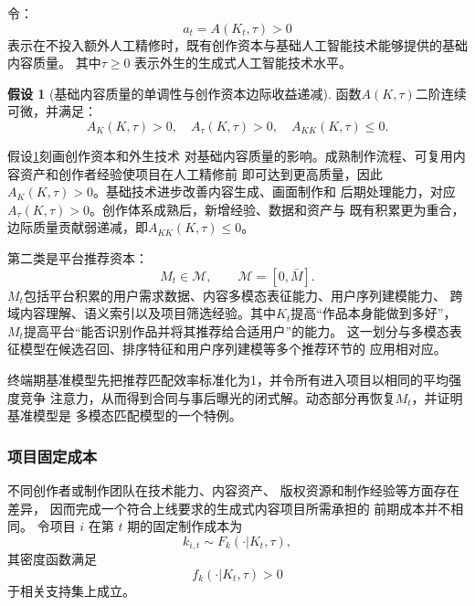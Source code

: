 \documentclass[UTF8, a4paper, 12pt, fontset=fandol]{ctexart}
\theoremstyle{definition}
\newtheorem{assumption}{假设}[section]
\theoremstyle{remark}
\begin{document}
令：
\begin{equation*}
  a_t = A(K_t,\tau) > 0
\end{equation*}
表示在不投入额外人工精修时，既有创作资本与基础人工智能技术能够提供的基础内容质量。
其中$\tau \ge 0$
表示外生的生成式人工智能技术水平。
\begin{assumption}[基础内容质量的单调性与创作资本边际收益递减]
  \label{ass:基础内容质量的单调性与创作资本边际收益递减}
  函数$A(K,\tau)$二阶连续可微，并满足：
  \begin{equation}
    A_K(K,\tau) > 0, \quad A_\tau(K,\tau) > 0,\quad A_{KK}(K,\tau) \le 0 .
  \end{equation}
\end{assumption}
假设\ref{ass:基础内容质量的单调性与创作资本边际收益递减}刻画创作资本和外生技术
对基础内容质量的影响。成熟制作流程、可复用内容资产和创作者经验使项目在人工精修前
即可达到更高质量，因此$A_K(K,\tau)>0$。基础技术进步改善内容生成、画面制作和
后期处理能力，对应$A_\tau(K,\tau)>0$。创作体系成熟后，新增经验、数据和资产与
既有积累更为重合，边际质量贡献弱递减，即$A_{KK}(K,\tau)\leq 0$。

第二类是平台推荐资本：
\begin{equation*}
  M_t\in\mathcal M,\qquad \mathcal M=[0,\bar M].
\end{equation*}
$M_t$包括平台积累的用户需求数据、内容多模态表征能力、用户序列建模能力、
跨域内容理解、语义索引以及项目筛选经验。其中$K_t$提高“作品本身能做到多好”，
$M_t$提高平台“能否识别作品并将其推荐给合适用户”的能力。
这一划分与多模态表征模型在候选召回、排序特征和用户序列建模等多个推荐环节的
应用相对应\citep{zhou2026wemm}。

终端期基准模型先把推荐匹配效率标准化为1，并令所有进入项目以相同的平均强度竞争
注意力，从而得到合同与事后曝光的闭式解。动态部分再恢复$M_t$，并证明基准模型是
多模态匹配模型的一个特例。
\subsubsection{项目固定成本}
不同创作者或制作团队在技术能力、内容资产、
版权资源和制作经验等方面存在差异，
因而完成一个符合上线要求的生成式内容项目所需承担的
前期成本并不相同。
令项目 $i$ 在第 $t$ 期的固定制作成本为
\begin{equation*}
  k_{i,t} \sim F_k (\cdot|K_t,\tau),
\end{equation*}
其密度函数满足
\begin{equation*}
  f_k(\cdot|K_t,\tau) > 0
\end{equation*}
于相关支持集上成立。
\end{document}
